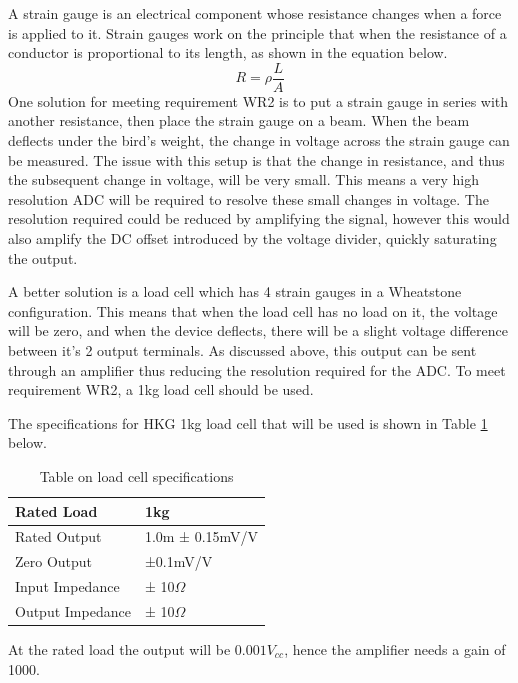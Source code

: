 \documentclass[class=report,11pt,crop=false]{standalone}
\begin{document}
	A strain gauge is an electrical component whose resistance changes when a force is applied to it. Strain gauges work on the principle that when the resistance of a conductor is proportional to its length, as shown in the equation below. 
	\[R = \rho \frac{L}{A}\]
	One solution for meeting requirement WR2 is to put a strain gauge in series with another resistance, then place the strain gauge on a beam. When the beam deflects under the bird’s weight, the change in voltage across the strain gauge can be measured. The issue with this setup is that the change in resistance, and thus the subsequent change in voltage, will be very small. This means a very high resolution ADC will be required to resolve these small changes in voltage. The resolution required could be reduced by amplifying the signal, however this would also amplify the DC offset introduced by the voltage divider, quickly saturating the output.
	
	A better solution is a load cell which has 4 strain gauges in a Wheatstone configuration. This means that when the load cell has no load on it, the voltage will be zero, and when the device deflects, there will be a slight voltage difference between it’s 2 output terminals. As discussed above, this output can be sent through an amplifier thus reducing the resolution required for the ADC. To meet requirement WR2, a 1kg load cell should be used. 
	
	The specifications for HKG 1kg load cell that will be used is shown in Table \ref{table:S2} below.

	\begin{table}[h!]
		\centering
		\caption{Table on load cell specifications}
		\begin{tabularx}{0.8\textwidth} { 
				| >{\centering\arraybackslash}X 
				| >{\centering\arraybackslash}X |}
			\hline
			Rated Load & 1kg \\
			\hline
			Rated Output & 1.0m ± 0.15mV/V \\
			\hline
			Zero Output & ±0.1mV/V \\
			\hline
			Input Impedance & 1115 ± 10$\Omega$ \\
			\hline
			Output Impedance & 1000 ± 10$\Omega$ \\
			\hline
		\end{tabularx}
		\label{table:S2}
	\end{table}
	
	At the rated load the output will be $0.001V_{cc}$, hence the amplifier needs a gain of 1000. 
	
\end{document}
